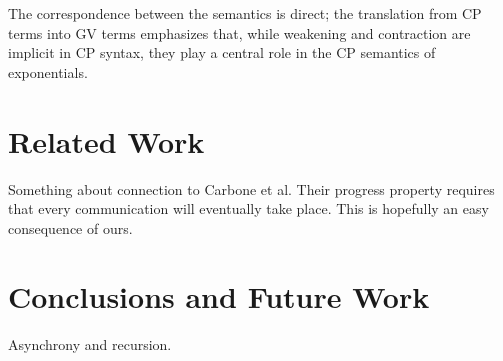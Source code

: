 \documentclass[orivec,envcountsame]{llncs}
\begin{document}
The correspondence between the semantics is direct; the translation from CP terms into GV terms
emphasizes that, while weakening and contraction are implicit in CP syntax, they play a central role
in the CP semantics of exponentials.

\section{Related Work}\label{sec:related}

Something about connection to Carbone et al.  Their progress property requires that every
communication will eventually take place.  This is hopefully an easy consequence of ours.

\section{Conclusions and Future Work}\label{sec:conclusion}

Asynchrony and recursion.
\end{document}
